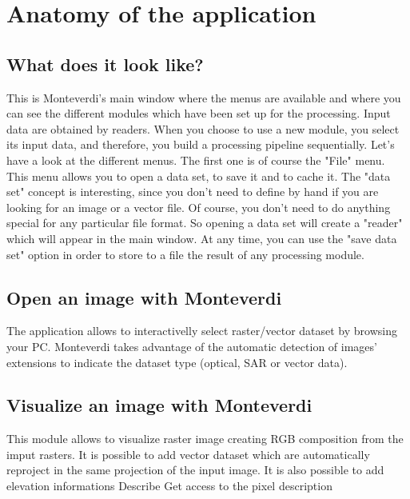 \documentclass{InsightSoftwareGuide}
\begin{document}
\chapter{Anatomy of the application}
\section{What does it look like?}
This is Monteverdi's main window where the menus are available and where you can see the different modules which have been 
set up for the processing. Input data are obtained by readers. When you choose to use a new module, you select its input data,
 and therefore, you build a processing pipeline sequentially. Let's have a look at the different menus. The first one is of
 course the "File" menu. This menu allows you to open a data set, to save it and to cache it. The "data set" concept is
 interesting, since you don't need to define by hand if you are looking for an image or a vector file. Of course, 
you don't need to do anything special for any particular file format. So opening a data set will create a "reader" 
which will appear in the main window. At any time, you can use the "save data set" option in order to store to a 
file the result of any processing module.
\section{Open an image with Monteverdi}
The application allows to interactivelly select raster/vector dataset by browsing your PC. Monteverdi takes
advantage of the automatic detection of images' extensions to indicate the dataset type (optical, SAR or vector data).   
\section{Visualize an image with Monteverdi}
This module allows to visualize raster image creating RGB composition from the imput rasters. It is possible to add 
vector dataset which are automatically reproject in the same projection of the input image. 
It is also possible to add elevation informations 
Describe Get access to the pixel description
\end{document}
